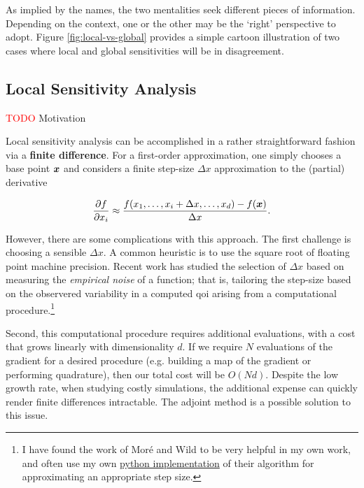 \documentclass[../primer.tex]{subfiles}
\begin{document}
As implied by the names, the two mentalities seek different pieces of
information. Depending on the context, one or the other may be the `right'
perspective to adopt. Figure \ref{fig:local-vs-global} provides a simple cartoon
illustration of two cases where local and global sensitivities will be in
disagreement.

\subsection{Local Sensitivity Analysis}
\textcolor{red}{TODO} Motivation

Local sensitivity analysis can be accomplished in a rather straightforward
fashion via a \textbf{finite difference}. For a first-order approximation, one
simply chooses a base point $\boldsymbol{x}$ and considers a finite step-size $\Delta x$
approximation to the (partial) derivative

\begin{equation}
  \frac{\partial f}{\partial x_i} \approx \frac{f(x_1,\dots,x_i+\Delta
    x,\dots,x_d) - f(\boldsymbol{x})}{\Delta x}.
\end{equation}

However, there are some complications with this approach. The first challenge is
choosing a sensible $\Delta x$. A common heuristic is to use the square root of
floating point machine precision. Recent work has studied the selection of
$\Delta x$ based on measuring the \emph{empirical noise} of a function; that is,
tailoring the step-size based on the observered variability in a computed qoi
arising from a computational procedure.\cite{more2012}\footnote{I have found the
  work of Mor{\'e} and Wild to be very helpful in my own work, and often use my
  own \href{https://github.com/zdelrosario/pyutil}{python implementation} of
  their algorithm for approximating an appropriate step size.}

Second, this computational procedure requires additional evaluations, with a
cost that grows linearly with dimensionality $d$. If we require $N$ evaluations
of the gradient for a desired procedure (e.g. building a map of the gradient or
performing quadrature), then our total cost will be $O(Nd)$. Despite the low
growth rate, when studying costly simulations, the additional expense can
quickly render finite differences intractable. The adjoint method is a possible
solution to this issue.
\end{document}
